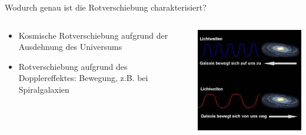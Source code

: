 \begin{frame}{Wodurch genau ist die Rotverschiebung charakterisiert?}
  \begin{columns}
 \begin{column}{0.5\textwidth}
  \begin{itemize}
      \setlength\itemsep{2em}
    \item Kosmische Rotverschiebung aufgrund der Ausdehnung des Universums
    \item Rotverschiebung aufgrund des Dopplereffektes: Bewegung, z.B. bei Spiralgalaxien
  \end{itemize}
  \end{column}
\begin{column}{0.5\textwidth}
  \includegraphics[width=\textwidth]{images/doppler.jpg}
\end{column}
  \end{columns}
\end{frame}

